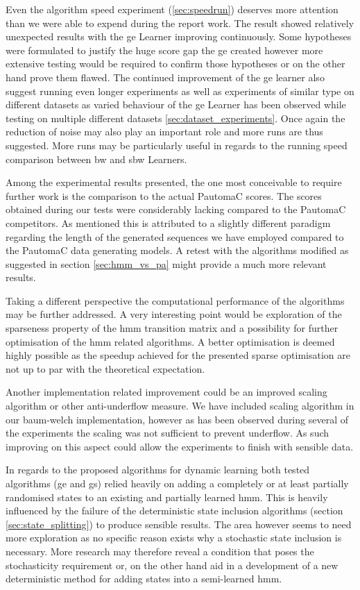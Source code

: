 Even the algorithm speed experiment (\ref{sec:speedrun}) deserves more attention than we were able to expend during the report work. The result showed relatively unexpected results with the \gls{ge} Learner improving continuously. Some hypotheses were formulated to justify the huge score gap the \gls{ge} created however more extensive testing would be required to confirm those hypotheses or on the other hand prove them flawed. The continued improvement of the \gls{ge} learner also suggest running even longer experiments as well as experiments of similar type on different datasets as varied behaviour of the \gls{ge} Learner has been observed while testing on multiple different datasets \ref{sec:dataset_experiments}. Once again the reduction of noise may also play an important role and more runs are thus suggested. More runs may be particularly useful in regards to the running speed comparison between \acrlong{bw} and \acrlong{sbw} Learners.

Among the experimental results presented, the one most conceivable to require further work is the comparison to the actual PautomaC scores. The scores obtained during our tests were considerably lacking compared to the PautomaC competitors. As mentioned this is attributed to a slightly different paradigm regarding the length of the generated sequences we have employed compared to the PautomaC data generating models. A retest with the algorithms modified as suggested in section \ref{sec:hmm_vs_pa} might provide a much more relevant results.

Taking a different perspective the computational performance of the algorithms may be further addressed. A very interesting point would be exploration of the sparseness property of the \gls{hmm} transition matrix and a possibility for further optimisation of the \gls{hmm} related algorithms. A better optimisation is deemed highly possible as the speedup achieved for the presented sparse optimisation are not up to par with the theoretical expectation.

Another implementation related improvement could be an improved scaling algorithm or other anti-underflow measure. We have included scaling algorithm in our \gls{baum-welch} implementation, however as has been observed during several of the experiments the scaling was not sufficient to prevent underflow. As such improving on this aspect could allow the experiments to finish with sensible data.

In regards to the proposed algorithms for dynamic learning both tested algorithms (\acrlong{ge} and \acrlong{gs}) relied heavily on adding a completely or at least partially randomised states to an existing and partially learned \gls{hmm}. This is heavily influenced by the failure of the deterministic state inclusion algorithms (section \ref{sec:state_splitting}) to produce sensible results. The area however seems to need more exploration as no specific reason exists why a stochastic state inclusion is necessary. More research may therefore reveal a condition that poses the stochasticity requirement or, on the other hand aid in a development of a new deterministic method for adding states into a semi-learned \gls{hmm}.

